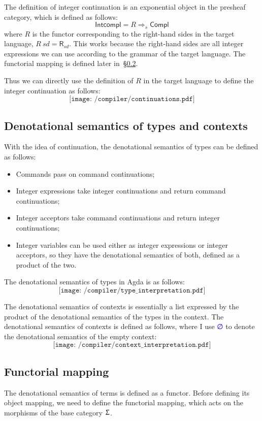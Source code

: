 \documentclass[12pt,a4paper]{report}
\theoremstyle{definition}
\newcommand{\secref}[1]{\S\ref{#1}}
\newcommand{\mb}[1]{\textcolor{mediumblue}{#1}}
\begin{document}
    The definition of integer continuation is an exponential object in the presheaf category, which is defined as follows:
    \[\mathsf{Intcompl} = R \Rightarrow_s \mathsf{Compl} \]
    where $R$ is the functor corresponding to the right-hand sides in the target language, $R\ \textit{sd} = \textsf{R}_{\textit{sd}}$. This works because the right-hand sides are all integer expressions we can use according to the grammar of the target language. The functorial mapping is defined later in~\secref{subsec: functorial_mapping}.
    
    Thus we can directly use the definition of $R$ in the target language to define the integer continuation as follows:
    \[\texttt{[image: /compiler/continuations.pdf]}\]

    \subsection{Denotational semantics of types and contexts} \label{subsec: type_interpretation}
    With the idea of continuation, the denotational semantics of types can be defined as follows:
    \begin{itemize}
        \item Commands pass on command continuations;
        \item Integer expressions take integer continuations and return command continuations;
        \item Integer acceptors take command continuations and return integer continuations;
        \item Integer variables can be used either as integer expressions or integer acceptors, so they have the denotational semantics of both, defined as a product of the two.
    \end{itemize}
    
    The denotational semantics of types in Agda is as follows:
    \[\texttt{[image: /compiler/type\_interpretation.pdf]}\]

    The denotational semantics of contexts is essentially a list expressed by the product of the denotational semantics of the types in the context. The denotational semantics of contexts is defined as follows, where I use \mb{∅} to denote the denotational semantics of the empty context:
    \[\texttt{[image: /compiler/context\_interpretation.pdf]}\]

    \subsection{Functorial mapping} \label{subsec: functorial_mapping}
    The denotational semantics of terms is defined as a functor. Before defining its object mapping, we need to define the functorial mapping, which acts on the morphisms of the base category $\Upsigma$. 
\end{document}
